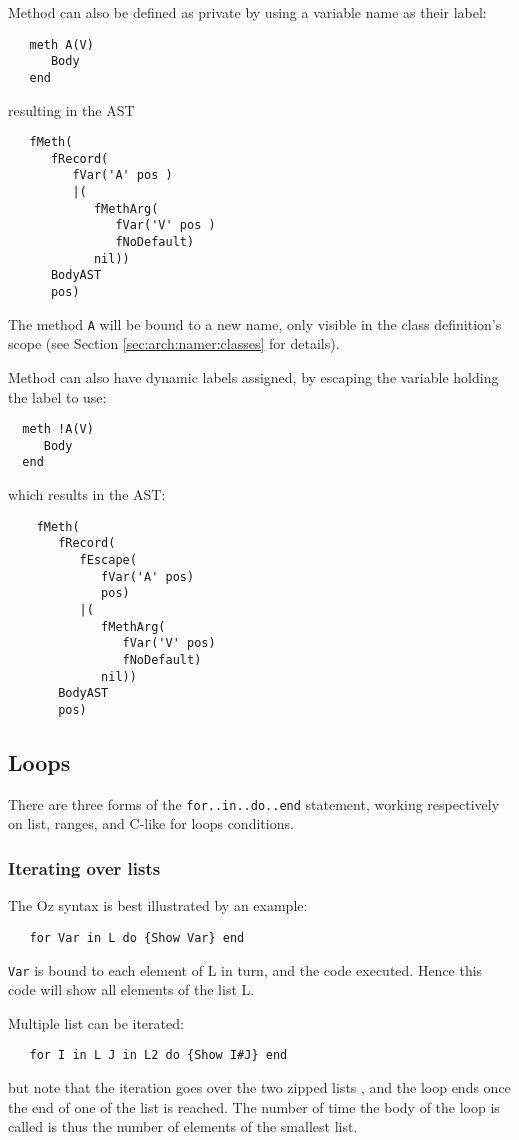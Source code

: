 \documentclass[a4paper]{memoir}
\begin{document}
Method can also be defined as private by using a variable name as their label:
\begin{lstlisting}
   meth A(V)
      Body
   end
\end{lstlisting}
resulting in the AST

\begin{lstlisting}
   fMeth(
      fRecord(
         fVar('A' pos )
         |(
            fMethArg(
               fVar('V' pos )
               fNoDefault)
            nil))
      BodyAST
      pos)
\end{lstlisting}
The method \lstinline!A! will be bound to a new name, only visible in the class
definition's scope (see Section \ref{sec:arch:namer:classes} for details).

Method can also have dynamic labels assigned, by escaping the variable holding
the label to use:
\begin{lstlisting}
  meth !A(V)
     Body
  end
\end{lstlisting}
which results in the AST:
\begin{lstlisting}
    fMeth(
       fRecord(
          fEscape(
             fVar('A' pos)
             pos)
          |(
             fMethArg(
                fVar('V' pos)
                fNoDefault)
             nil))
       BodyAST
       pos)

\end{lstlisting}

\subsection{Loops}
There are three forms of the \lstinline!for..in..do..end! statement, working
respectively on list, ranges, and C-like for loops conditions.
\subsubsection{Iterating over lists}
The Oz syntax is best illustrated by an example:
\begin{lstlisting}
   for Var in L do {Show Var} end
\end{lstlisting}
\lstinline!Var! is bound to each element of L in turn, and the code executed.
Hence this code will show all elements of the list L.

Multiple list can be iterated:
\begin{lstlisting}
   for I in L J in L2 do {Show I#J} end
\end{lstlisting}
but note that the iteration goes over the two zipped lists , and the loop ends once the
end of one of the list is reached. The number of time the body of the loop is
called is thus the number of elements of the smallest list.
\end{document}
